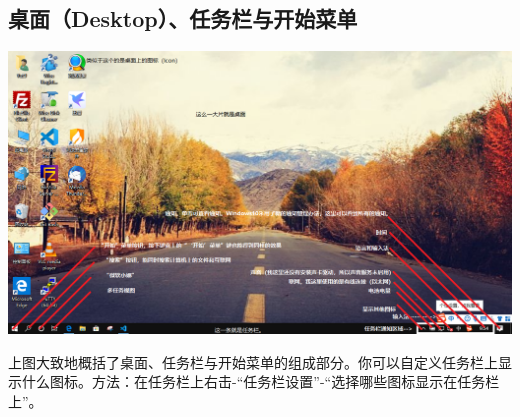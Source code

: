 \subsection{桌面（Desktop）、任务栏与开始菜单}
\begin{center}
	\includegraphics[scale=0.4,angle=90]{pic/screenIntro}
\end{center} \par
上图大致地概括了桌面、任务栏与开始菜单的组成部分。你可以自定义任务栏上显示什么图标。方法：在任务栏上右击-“任务栏设置”-“选择哪些图标显示在任务栏上”。
